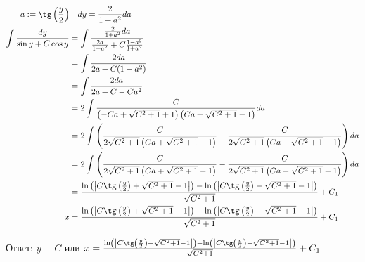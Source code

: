 \begin{align*}
    a := \tg\left(\frac{y}{2}\right) & \quad dy = \frac{2}{1 + a^2}da                                                                                                                                               \\
    \int \frac{dy}{\sin y + C\cos y}
                                     & = \int \frac{\frac{2}{1 + a^2}da}{\frac{2a}{1+a^2} + C\frac{1-a^2}{1+a^2}}                                                                                                   \\
                                     & = \int \frac{2da}{2a + C(1-a^2)}                                                                                                                                             \\
                                     & = \int \frac{2da}{2a + C - Ca^2}                                                                                                                                             \\
                                     & = 2\int \frac{C}{\left(-Ca+\sqrt{C^2+1}+1\right)\left(Ca+\sqrt{C^2+1}-1\right)} da                                                                                           \\
                                     & = 2\int \left(\frac{C}{2\sqrt{C^2+1}\left(Ca+\sqrt{C^2+1}-1\right)} - \frac{C}{2\sqrt{C^2+1}\left(Ca-\sqrt{C^2+1}-1\right)}\right) da                                        \\
                                     & = 2\int \left(\frac{C}{2\sqrt{C^2+1}\left(Ca+\sqrt{C^2+1}-1\right)} - \frac{C}{2\sqrt{C^2+1}\left(Ca-\sqrt{C^2+1}-1\right)}\right) da                                        \\
                                     & = \frac{\ln\left(\left|C\tg\left(\frac{y}{2}\right)+\sqrt{C^2+1}-1\right|\right)-\ln\left(\left|C\tg\left(\frac{y}{2}\right)-\sqrt{C^2+1}-1\right|\right)}{\sqrt{C^2+1}}+C_1 \\
    x                                & = \frac{\ln\left(\left|C\tg\left(\frac{y}{2}\right)+\sqrt{C^2+1}-1\right|\right)-\ln\left(\left|C\tg\left(\frac{y}{2}\right)-\sqrt{C^2+1}-1\right|\right)}{\sqrt{C^2+1}}+C_1 \\
\end{align*}

Ответ: $y\equiv C$ или $x = \frac{\ln\left(\left|C\tg\left(\frac{y}{2}\right)+\sqrt{C^2+1}-1\right|\right)-\ln\left(\left|C\tg\left(\frac{y}{2}\right)-\sqrt{C^2+1}-1\right|\right)}{\sqrt{C^2+1}}+C_1$

